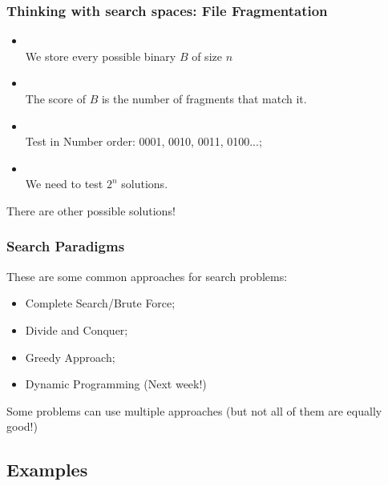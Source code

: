\documentclass{beamer}
\begin{document}
\begin{frame}
  \frametitle{Thinking with search spaces: File Fragmentation}
  \begin{itemize}
  \item {}\\
    We store every possible binary $B$ of size $n$
  \item {}\\
    The score of $B$ is the number of fragments that
    match it.
  \item {}\\
    Test in Number order: 0001, 0010, 0011, 0100...;
  \item {}\\
    We need to test $2^n$ solutions.
  \end{itemize}

  \bigskip

  There are other possible solutions!
\end{frame}

\begin{frame}
  \frametitle{Search Paradigms}
  These are some common approaches for search problems:

  \begin{itemize}
    \item Complete Search/Brute Force;
    \item Divide and Conquer;
    \item Greedy Approach;
    \item Dynamic Programming (Next week!)
  \end{itemize}

  \bigskip

  Some problems can use multiple approaches (but
  not all of them are equally good!)
\end{frame}

\subsection{Examples}
\end{document}
